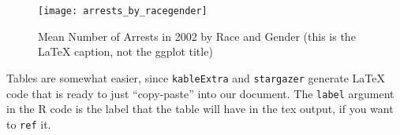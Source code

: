 \documentclass{article}
\begin{document}
\begin{figure}[H]
    \begin{center}
        \texttt{[image: arrests\_by\_racegender]}
    \end{center}
    \caption{Mean Number of Arrests in 2002 by Race and Gender (this is the LaTeX caption, not the ggplot title)}
    \label{fig:graph}
\end{figure}


Tables are somewhat easier, since \texttt{kableExtra} and \texttt{stargazer} generate LaTeX code that is ready to just ``copy-paste'' into our document. The \texttt{label} argument in the R code is the label that the table will have in the tex output, if you want to \texttt{ref} it.




\end{document}
